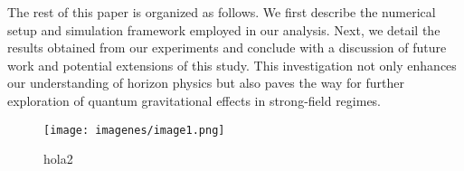 \documentclass{article}\usepackage{graphicx} \usepackage{amsmath} \usepackage{colortbl} \usepackage[utf8]{inputenc} %
\begin{document}
The rest of this paper is organized as follows. We first describe the numerical setup and simulation framework employed in our analysis. Next, we detail the results obtained from our experiments and conclude with a discussion of future work and potential extensions of this study. This investigation not only enhances our understanding of horizon physics but also paves the way for further exploration of quantum gravitational effects in strong-field regimes.\begin{figure}\centering\texttt{[image: imagenes/image1.png]}\caption{hola2}\label{hola3}\end{figure}
\end{document}
